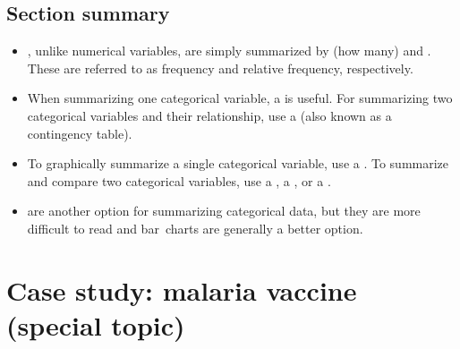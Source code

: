 \subsection*{Section summary}
\begin{itemize}
\item {}, unlike numerical variables, are simply summarized by  (how many) and .  These are referred to as frequency and relative frequency, respectively.

\item When summarizing one categorical variable, a  is useful.  For summarizing two categorical variables and their relationship, use a  (also known as a contingency table).

\item To graphically summarize a single categorical variable, use a .  To summarize and compare two categorical variables, use a , a , or a .

\item {} are another option for summarizing categorical data, but they are more difficult to read and bar~charts are generally a better option.  
\end{itemize}




{}



\section{Case study: malaria vaccine (special topic)}
\label{caseStudyMalariaVaccine}

